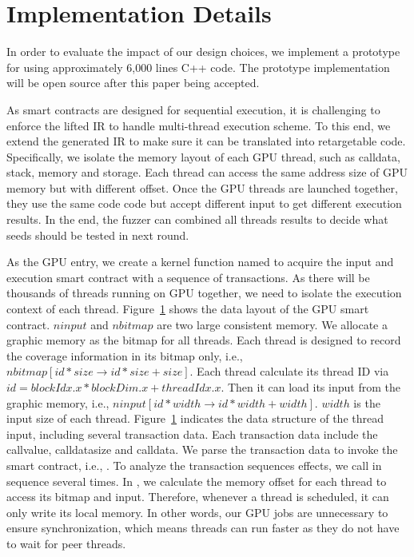 \section{Implementation Details}

In order to evaluate the impact of our design choices, we implement a prototype for {\tool} using approximately 6,000 lines C++ code.
The prototype implementation will be open source after this paper being accepted.


As smart contracts are designed for sequential execution, it is challenging to enforce the lifted IR to handle multi-thread execution scheme. 
To this end, we extend the generated IR to make sure it can be translated into retargetable code.
Specifically, we isolate the memory layout of each GPU thread, such as calldata, stack, memory and storage.
Each thread can access the same address size of GPU memory but with different offset. Once the GPU threads are launched together, they use the same code code but accept different input to get different execution results. In the end, the fuzzer can combined all threads results to decide what seeds should be tested in next round.

As the GPU entry, we create a kernel function named  to acquire the input and execution smart contract with a sequence of transactions. 
As there will be thousands of threads running on GPU together, we need to isolate the execution context of each thread. 
Figure~\ref{} shows the data layout of the GPU smart contract. $ninput$ and $nbitmap$ are two large consistent memory.
We allocate a graphic memory as the bitmap for all threads. Each thread is designed to record the coverage information in its bitmap only, i.e., $nbitmap[id*size\to id*size+size]$. 
Each thread calculate its thread ID via $id = blockIdx.x * blockDim.x + threadIdx.x$. Then it can load its input from the graphic memory, i.e., $ninput[id*width\to id*width+width]$. $width$ is the input size of each thread. 
Figure~\ref{} indicates the data structure of the thread input, including several transaction data. Each transaction data include the callvalue, calldatasize and calldata. We parse the transaction data to invoke the smart contract, i.e., . To analyze the transaction sequences effects, we call  in sequence several times. 
In , we calculate the memory offset for each thread to access its bitmap and input.
Therefore, whenever a thread is scheduled, it can only write its local memory. In other words, our GPU jobs are unnecessary to ensure synchronization, which means threads can run faster as they do not have to wait for peer threads. 


